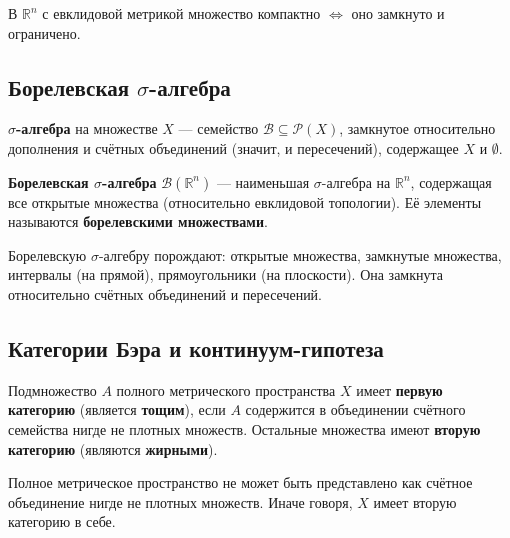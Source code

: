 \documentclass[11pt, a4paper]{extarticle}
\newcommand{\Pcal}{{\mathcal P}}
\newcommand{\Bcal}{{\mathcal B}}
\newcommand{\R}{{\mathbb R}}
\begin{document}
\begin{theorem}
В $\R^n$ с евклидовой метрикой множество компактно $\iff$ оно замкнуто и ограничено.
\end{theorem}

\subsection{Борелевская \texorpdfstring{$\sigma$}{сигма}-алгебра}

\begin{definition}
\textbf{$\sigma$-алгебра} на множестве $X$ --- семейство $\Bcal \subseteq \Pcal(X)$, замкнутое относительно дополнения и счётных объединений (значит, и пересечений), содержащее $X$ и $\emptyset$.

\textbf{Борелевская $\sigma$-алгебра} $\Bcal(\R^n)$ --- наименьшая $\sigma$-алгебра на $\R^n$, содержащая все открытые множества (относительно евклидовой топологии). Её элементы называются \textbf{борелевскими множествами}.
\end{definition}

\begin{remark}
Борелевскую $\sigma$-алгебру порождают: открытые множества, замкнутые множества, интервалы (на прямой), прямоугольники (на плоскости). Она замкнута относительно счётных объединений и пересечений.
\end{remark}

\subsection{Категории Бэра и континуум-гипотеза}

\begin{definition}
Подмножество $A$ полного метрического пространства $X$ имеет \textbf{первую категорию} (является \textbf{тощим}), если $A$ содержится в объединении счётного семейства нигде не плотных множеств. Остальные множества имеют \textbf{вторую категорию} (являются \textbf{жирными}).
\end{definition}

\begin{theorem}
Полное метрическое пространство не может быть представлено как счётное объединение нигде не плотных множеств. Иначе говоря, $X$ имеет вторую категорию в себе.
\end{theorem}
\end{document}
